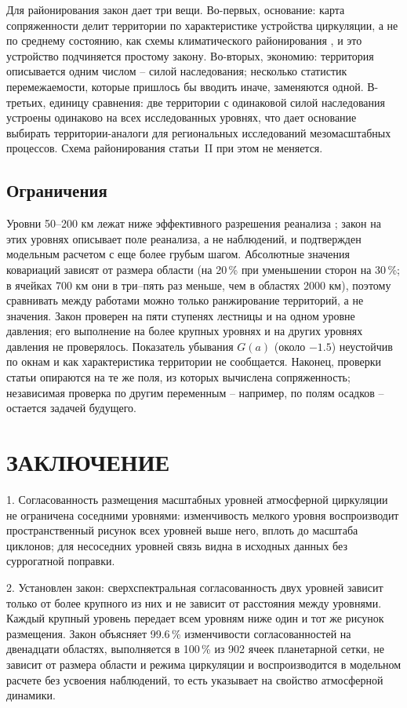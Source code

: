 \documentclass[12pt,a4paper]{article}
\begin{document}
Для районирования закон дает три вещи. Во-первых, основание: карта сопряженности делит территории по характеристике устройства циркуляции, а не по среднему состоянию, как схемы климатического районирования \cite{Isachenko1991}, и это устройство подчиняется простому закону. Во-вторых, экономию: территория описывается одним числом -- силой наследования; несколько статистик перемежаемости, которые пришлось бы вводить иначе, заменяются одной. В-третьих, единицу сравнения: две территории с одинаковой силой наследования устроены одинаково на всех исследованных уровнях, что дает основание выбирать территории-аналоги для региональных исследований мезомасштабных процессов. Схема районирования статьи~II при этом не меняется.

\subsection{Ограничения}

Уровни 50--200 км лежат ниже эффективного разрешения реанализа \cite{Skamarock2004}; закон на этих уровнях описывает поле реанализа, а не наблюдений, и подтвержден модельным расчетом с еще более грубым шагом. Абсолютные значения ковариаций зависят от размера области (на 20\,\% при уменьшении сторон на 30\,\%; в ячейках 700 км они в три--пять раз меньше, чем в областях 2000 км), поэтому сравнивать между работами можно только ранжирование территорий, а не значения. Закон проверен на пяти ступенях лестницы и на одном уровне давления; его выполнение на более крупных уровнях и на других уровнях давления не проверялось. Показатель убывания $G(a)$ (около $-1.5$) неустойчив по окнам и как характеристика территории не сообщается. Наконец, проверки статьи опираются на те же поля, из которых вычислена сопряженность; независимая проверка по другим переменным -- например, по полям осадков -- остается задачей будущего.

\section{ЗАКЛЮЧЕНИЕ}

1. Согласованность размещения масштабных уровней атмосферной циркуляции не ограничена соседними уровнями: изменчивость мелкого уровня воспроизводит пространственный рисунок всех уровней выше него, вплоть до масштаба циклонов; для несоседних уровней связь видна в исходных данных без суррогатной поправки.

2. Установлен закон: сверхспектральная согласованность двух уровней зависит только от более крупного из них и не зависит от расстояния между уровнями. Каждый крупный уровень передает всем уровням ниже один и тот же рисунок размещения. Закон объясняет 99.6\,\% изменчивости согласованностей на двенадцати областях, выполняется в 100\,\% из 902 ячеек планетарной сетки, не зависит от размера области и режима циркуляции и воспроизводится в модельном расчете без усвоения наблюдений, то есть указывает на свойство атмосферной динамики.
\end{document}
